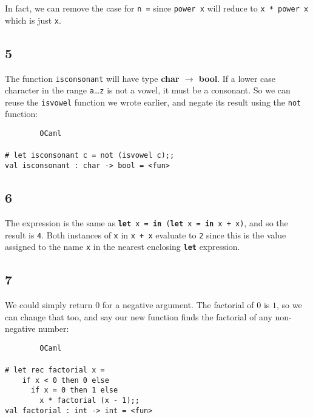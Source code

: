 \documentclass[]{book}
\newcommand\upquote[1]{\textquotesingle#1\textquotesingle}
\newcommand{\smspace}{\vspace{4mm}}
\begin{document}
\noindent In fact, we can remove the case for \texttt{n\! =} since \texttt{power\! x} will reduce to \texttt{x\! *\! power\! x} which is just \texttt{x}.

\subsection*{5}
The function \texttt{isconsonant} will have type \textbf{\textsf{char $\rightarrow$ bool}}. If a lower case character in the range \texttt{\upquote{a}}\ldots\texttt{\upquote{z}} is not a vowel, it must be a consonant. So we can reuse the \texttt{isvowel} function we wrote earlier, and negate its result using the \texttt{not} function:

\smspace
\noindent\verb!        OCaml!\\
\noindent\\
\noindent\verb!# let isconsonant c = not (isvowel c);;!\\
\noindent\verb!val isconsonant : char -> bool = <fun>!

\subsection*{6}
The expression is the same as \texttt{\textbf{let}\! x\! =\! \textbf{in}\! (\textbf{let}\! x\! =\! \textbf{in}\! x\! +\! x)}, and so the result is \texttt{4}. Both instances of \texttt{x} in \texttt{x\! +\! x} evaluate to \texttt{2} since this is the value assigned to the name \texttt{x} in the nearest enclosing \texttt{\textbf{let}} expression.

\subsection*{7}
We could simply return $0$ for a negative argument. The factorial of $0$ is $1$, so we can change that too, and say our new function finds the factorial of any non-negative number:

\smspace
\noindent\verb!        OCaml!\\
\noindent\\
\noindent\verb!# let rec factorial x =!\\
\noindent\verb!    if x < 0 then 0 else!\\
\noindent\verb!      if x = 0 then 1 else!\\
\noindent\verb!        x * factorial (x - 1);;!\\
\noindent\verb!val factorial : int -> int = <fun>!
\smspace
\end{document}
